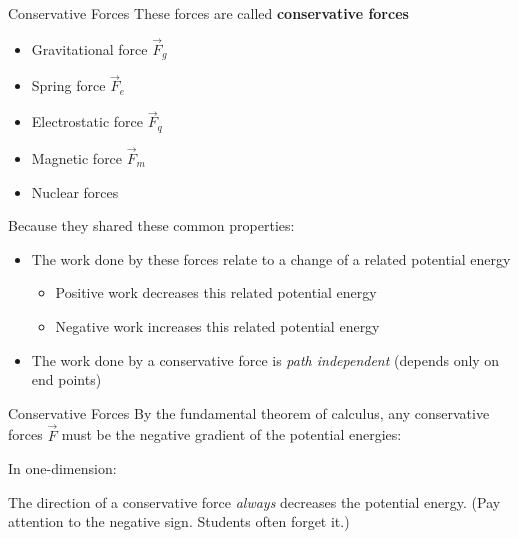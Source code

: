 \documentclass[12pt,compress,aspectratio=169]{beamer}
\begin{document}
\begin{frame}{Conservative Forces}
  These forces are called \textbf{conservative forces}
  \begin{itemize}
  \item Gravitational force $\vec F_g$
  \item Spring force $\vec F_e$
  \item Electrostatic force $\vec F_q$
  \item Magnetic force $\vec F_m$
  \item Nuclear forces
  \end{itemize}
  Because they shared these common properties:
  \begin{itemize}
  \item The work done by these forces relate to a change of a related
    potential energy
    \begin{itemize}
    \item Positive work decreases this related potential energy
    \item Negative work increases this related potential energy
    \end{itemize}
  \item The work done by a conservative force is \emph{path independent}
    (depends only on end points)
  \end{itemize}
\end{frame}



\begin{frame}{Conservative Forces}
  By the fundamental theorem of calculus, any conservative forces $\vec F$
  must be the negative gradient of the potential energies:


  In one-dimension:


  The direction of a conservative force \emph{always} decreases the potential
  energy. (Pay attention to the negative sign. Students often forget it.)
\end{frame}
\end{document}
